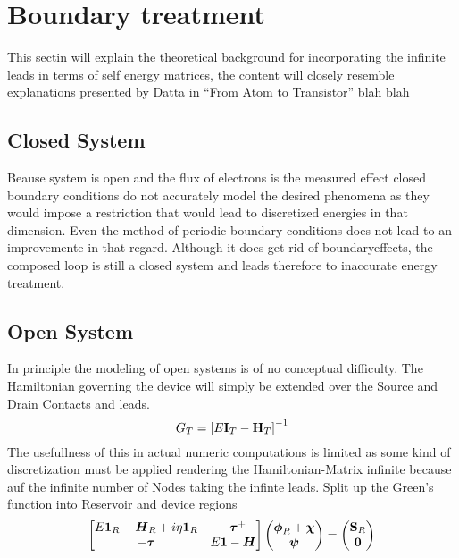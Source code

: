 
\author{Jonas Siegl}



\section{Boundary treatment}
This sectin will explain the theoretical background for incorporating the infinite leads in terms of self energy matrices, the content will closely resemble
explanations presented by Datta in ``From Atom to Transistor'' blah blah
\subsection{Closed System}
Beause system is open and the flux of electrons is the measured effect closed boundary conditions do not accurately model
the desired phenomena as they would impose a restriction  that would lead to discretized energies in that dimension.
Even the method of periodic boundary conditions does not lead to an improvemente in that regard. Although it does get rid of
boundaryeffects, the composed loop is still a closed system and leads therefore to inaccurate energy treatment.
\subsection{Open System}
In principle the modeling of open systems is of no conceptual difficulty. The Hamiltonian governing the device will simply be
extended over the Source and Drain Contacts and leads.
\begin{equation}
	G_T = \left[E\mathbf{I}_T - \mathbf{H}_T \right]^{-1}
	\label{Total Hamiltonian}
\end{equation}
The usefullness of this in actual numeric computations is limited as some kind of discretization must be applied rendering
the Hamiltonian-Matrix infinite because auf the infinite number of Nodes taking the infinte leads.
Split up the Green's function into Reservoir and device regions
\begin{equation}
  \begin{bmatrix}
	  E\mabol{1}_R - \mabol{H}_R +i\eta\mabol{1}_R 	& -\gv{\tau}^+ \\
	  -\gv{\tau} 				& E\mabol{1} - \mabol{H}
  \end{bmatrix}
  \begin{pmatrix*}[c]
	  \gv{\phi}_R + \gv{\chi}\\
    \gv{\psi}
  \end{pmatrix*}
  = 
  \begin{pmatrix*}[c]
    \v{S}_R \\
    \v{0}
  \end{pmatrix*}
  \label{green divided}
\end{equation}

